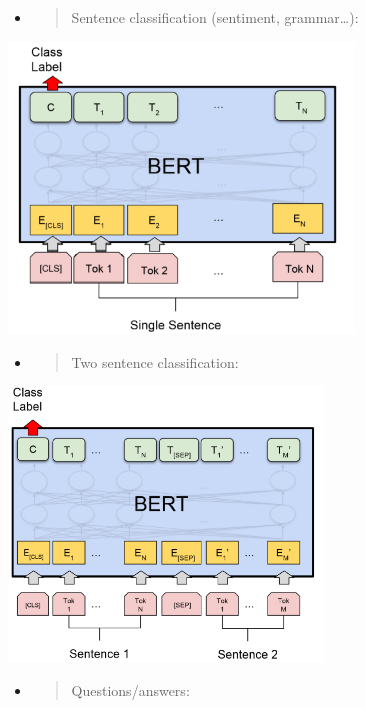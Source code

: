 \begin{itemize}
\item
  \begin{quote}
  Sentence classification (sentiment, grammar\ldots):
  \end{quote}
\end{itemize}

\includegraphics[width=3.61979in,height=3.04856in]{media/image13.png}

\begin{itemize}
\item
  \begin{quote}
  Two sentence classification:
  \end{quote}
\end{itemize}

\includegraphics[width=3.29688in,height=2.8697in]{media/image19.png}

\begin{itemize}
\item
  \begin{quote}
  Questions/answers:
  \end{quote}
\end{itemize}

